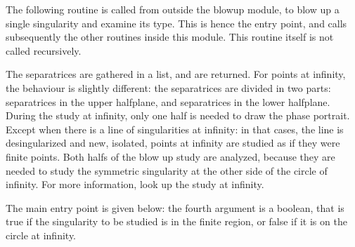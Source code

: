 \documentclass[a4paper,10pt]{article}
\begin{document}
The following routine is called from outside the blowup module, to blow up a single singularity
and examine its type.  This is hence the entry point, and calls subsequently the other routines inside
this module.  This routine itself is not called recursively.
\medskip

The separatrices are gathered in a list, and are returned.  For points at infinity, the behaviour
is slightly different: the separatrices are divided in two parts: separatrices in the upper halfplane,
and separatrices in the lower halfplane.  During the study at infinity, only one half is needed
to draw the phase portrait.  Except when there is a line of singularities at infinity: in that
cases, the line is desingularized and new, isolated, points at infinity are studied as if they were
finite points.  Both halfs of the blow up study are analyzed, because they are needed to study
the symmetric singularity at the other side of the circle of infinity.  For more information, look up the
study at infinity.

The main entry point is given below: the fourth argument is a boolean, that is true if the singularity
to be studied is in the finite region, or false if it is on the circle at infinity.
\end{document}

